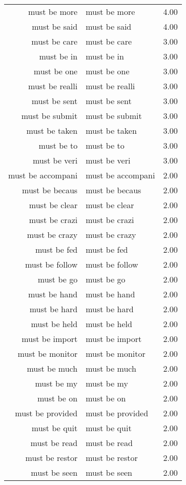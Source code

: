 \begin{table}[ht]
\begin{tabular}{rlr}
  must be more & must be more & 4.00 \\ 
  must be said & must be said & 4.00 \\ 
  must be care & must be care & 3.00 \\ 
  must be in & must be in & 3.00 \\ 
  must be one & must be one & 3.00 \\ 
  must be realli & must be realli & 3.00 \\ 
  must be sent & must be sent & 3.00 \\ 
  must be submit & must be submit & 3.00 \\ 
  must be taken & must be taken & 3.00 \\ 
  must be to & must be to & 3.00 \\ 
  must be veri & must be veri & 3.00 \\ 
  must be accompani & must be accompani & 2.00 \\ 
  must be becaus & must be becaus & 2.00 \\ 
  must be clear & must be clear & 2.00 \\ 
  must be crazi & must be crazi & 2.00 \\ 
  must be crazy & must be crazy & 2.00 \\ 
  must be fed & must be fed & 2.00 \\ 
  must be follow & must be follow & 2.00 \\ 
  must be go & must be go & 2.00 \\ 
  must be hand & must be hand & 2.00 \\ 
  must be hard & must be hard & 2.00 \\ 
  must be held & must be held & 2.00 \\ 
  must be import & must be import & 2.00 \\ 
  must be monitor & must be monitor & 2.00 \\ 
  must be much & must be much & 2.00 \\ 
  must be my & must be my & 2.00 \\ 
  must be on & must be on & 2.00 \\ 
  must be provided & must be provided & 2.00 \\ 
  must be quit & must be quit & 2.00 \\ 
  must be read & must be read & 2.00 \\ 
  must be restor & must be restor & 2.00 \\ 
  must be seen & must be seen & 2.00 \\ 

\end{tabular}
\end{table}
